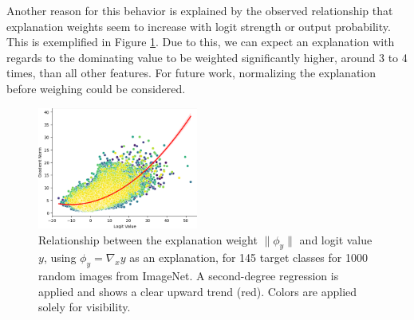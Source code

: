 Another reason for this behavior is explained by the observed relationship that explanation weights seem to increase with logit strength or output probability. This is exemplified in Figure \ref{fig:explanation-relationship}. Due to this, we can expect an explanation with regards to the dominating value to be weighted significantly higher, around 3 to 4 times, than all other features. For future work, normalizing the explanation before weighing could be considered.
\begin{figure}
    \tiny
    \centering

    \includegraphics[width=0.47\textwidth]{figures/logit_gradientnorm_relationship.png}
    
    \caption{Relationship between the explanation weight $\|\phi_y\|$ and logit value $y$, using $\phi_y = \nabla_x y$ as an explanation, for 145 target classes for 1000 random images from ImageNet. A second-degree regression is applied and shows a clear upward trend (red). Colors are applied solely for visibility.}
    \label{fig:explanation-relationship}
\end{figure}

